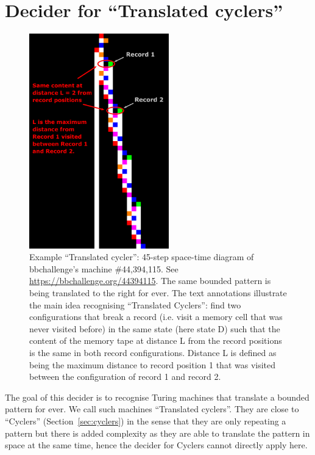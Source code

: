\newpage
\section{Decider for ``Translated cyclers''}\label{sec:translated-cyclers}

\begin{figure}[h!]
  \centering
  \includegraphics[width=0.54\textwidth]{space-time-diagrams/translated_cycler_44394115_annotated.pdf}

  \caption{Example ``Translated cycler'': 45-step space-time diagram of bbchallenge's machine \#44,394,115. See \url{https://bbchallenge.org/44394115}. The same bounded pattern is being translated to the right for ever. The text annotations illustrate the main idea recognising ``Translated Cyclers'': find two configurations that break a record (i.e. visit a memory cell that was never visited before) in the same state (here state \textcolor{colorD}{D}) such that the content of the memory tape at distance L from the record positions is the same in both record configurations. Distance L is defined as being the maximum distance to record position 1 that was visited between the configuration of record 1 and record 2.}\label{fig:translated-cyclers}
  \end{figure}
  
The goal of this decider is to recognise Turing machines that translate a bounded pattern for ever. We call such machines ``Translated cyclers''. They are close to ``Cyclers'' (Section~\ref{sec:cyclers}) in the sense that they are only repeating a pattern but there is added complexity as they are able to translate the pattern in space at the same time, hence the decider for Cyclers cannot directly apply here.

